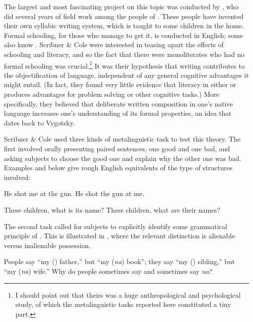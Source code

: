 The largest and most fascinating project on this topic was conducted by \citet{ScribnerEtAl1981}, who did several years of field work among the  people of . These people have invented their own syllabic writing system, which is taught to some children in the home. Formal schooling, for those who manage to get it, is conducted in English; some  also know . Scribner \& Cole were interested in teasing apart the effects of schooling and literacy, and so the fact that there were  monoliterates who had no formal schooling was crucial.\footnote{ I should point out that theirs was a huge anthropological and psychological study, of which the metalinguistic tasks reported here constituted a tiny part.}
 It was their hypothesis that writing contributes to the objectification of language, independent of any general cognitive advantages it might entail. (In fact, they found very little evidence that literacy in either  or  produces advantages for problem solving or other cognitive tasks.) More specifically, they believed that deliberate written composition in one's native language increases one's understanding of its formal properties, an idea that dates back to Vygotsky.
 
 Scribner \& Cole used three kinds of metalinguistic task to test this theory. The first involved orally presenting paired sentences, one good and one bad, and asking subjects to choose the good one and explain why the other one was bad.
Examples  and  below give rough English equivalents of the type of structures involved:

\ea\label{ex:4:5}
\ea He shot me at the gun.
\ex  He shot the gun at me.
\z
\z


\ea\label{ex:4:6}
\ea These children, what is its name? 
\ex These children, what are their names?
\z
\z

\noindent
The second task called for subjects to explicitly identify some grammatical principle of . This is illustrated in , where the relevant distinction is alienable versus inalienable possession.

\ea%
    \label{ex:4:7}
    
	  People say ``my (\textit{{\ng}}) father,'' but ``my (\textit{na}) book''; they say ``my (\textit{{\ng}}) sibling,'' but ``my (\textit{na}) wife.'' Why do people sometimes say \textit{{\ng}} and sometimes say \textit{na}?
    


